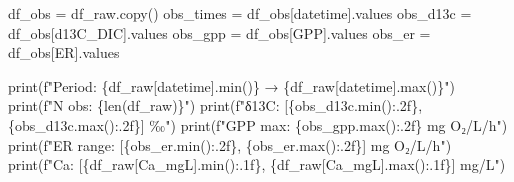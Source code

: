 \documentclass[
  letterpaper,
  DIV=11,
  numbers=noendperiod]{scrartcl}
\newenvironment{Shaded}{\begin{snugshade}}{\end{snugshade}}
\newcommand{\BuiltInTok}[1]{\textcolor[rgb]{0.00,0.23,0.31}{#1}}
\newcommand{\NormalTok}[1]{\textcolor[rgb]{0.00,0.23,0.31}{#1}}
\newcommand{\OperatorTok}[1]{\textcolor[rgb]{0.37,0.37,0.37}{#1}}
\newcommand{\SpecialCharTok}[1]{\textcolor[rgb]{0.37,0.37,0.37}{#1}}
\newcommand{\SpecialStringTok}[1]{\textcolor[rgb]{0.13,0.47,0.30}{#1}}
\newcommand{\StringTok}[1]{\textcolor[rgb]{0.13,0.47,0.30}{#1}}
\begin{document}
\begin{Shaded}
\begin{Highlighting}[]
\NormalTok{df\_obs    }\OperatorTok{=}\NormalTok{ df\_raw.copy()}
\NormalTok{obs\_times }\OperatorTok{=}\NormalTok{ df\_obs[}\StringTok{\textquotesingle{}datetime\textquotesingle{}}\NormalTok{].values}
\NormalTok{obs\_d13c  }\OperatorTok{=}\NormalTok{ df\_obs[}\StringTok{\textquotesingle{}d13C\_DIC\textquotesingle{}}\NormalTok{].values}
\NormalTok{obs\_gpp   }\OperatorTok{=}\NormalTok{ df\_obs[}\StringTok{\textquotesingle{}GPP\textquotesingle{}}\NormalTok{].values}
\NormalTok{obs\_er    }\OperatorTok{=}\NormalTok{ df\_obs[}\StringTok{\textquotesingle{}ER\textquotesingle{}}\NormalTok{].values}

\BuiltInTok{print}\NormalTok{(}\SpecialStringTok{f"Period: }\SpecialCharTok{\{}\NormalTok{df\_raw[}\StringTok{\textquotesingle{}datetime\textquotesingle{}}\NormalTok{]}\SpecialCharTok{.}\BuiltInTok{min}\NormalTok{()}\SpecialCharTok{\}}\SpecialStringTok{ → }\SpecialCharTok{\{}\NormalTok{df\_raw[}\StringTok{\textquotesingle{}datetime\textquotesingle{}}\NormalTok{]}\SpecialCharTok{.}\BuiltInTok{max}\NormalTok{()}\SpecialCharTok{\}}\SpecialStringTok{"}\NormalTok{)}
\BuiltInTok{print}\NormalTok{(}\SpecialStringTok{f"N obs:    }\SpecialCharTok{\{}\BuiltInTok{len}\NormalTok{(df\_raw)}\SpecialCharTok{\}}\SpecialStringTok{"}\NormalTok{)}
\BuiltInTok{print}\NormalTok{(}\SpecialStringTok{f"δ13C:     [}\SpecialCharTok{\{}\NormalTok{obs\_d13c}\SpecialCharTok{.}\BuiltInTok{min}\NormalTok{()}\SpecialCharTok{:.2f\}}\SpecialStringTok{, }\SpecialCharTok{\{}\NormalTok{obs\_d13c}\SpecialCharTok{.}\BuiltInTok{max}\NormalTok{()}\SpecialCharTok{:.2f\}}\SpecialStringTok{] ‰"}\NormalTok{)}
\BuiltInTok{print}\NormalTok{(}\SpecialStringTok{f"GPP max:  }\SpecialCharTok{\{}\NormalTok{obs\_gpp}\SpecialCharTok{.}\BuiltInTok{max}\NormalTok{()}\SpecialCharTok{:.2f\}}\SpecialStringTok{ mg O₂/L/h"}\NormalTok{)}
\BuiltInTok{print}\NormalTok{(}\SpecialStringTok{f"ER range: [}\SpecialCharTok{\{}\NormalTok{obs\_er}\SpecialCharTok{.}\BuiltInTok{min}\NormalTok{()}\SpecialCharTok{:.2f\}}\SpecialStringTok{, }\SpecialCharTok{\{}\NormalTok{obs\_er}\SpecialCharTok{.}\BuiltInTok{max}\NormalTok{()}\SpecialCharTok{:.2f\}}\SpecialStringTok{] mg O₂/L/h"}\NormalTok{)}
\BuiltInTok{print}\NormalTok{(}\SpecialStringTok{f"Ca:       [}\SpecialCharTok{\{}\NormalTok{df\_raw[}\StringTok{\textquotesingle{}Ca\_mgL\textquotesingle{}}\NormalTok{]}\SpecialCharTok{.}\BuiltInTok{min}\NormalTok{()}\SpecialCharTok{:.1f\}}\SpecialStringTok{, }\SpecialCharTok{\{}\NormalTok{df\_raw[}\StringTok{\textquotesingle{}Ca\_mgL\textquotesingle{}}\NormalTok{]}\SpecialCharTok{.}\BuiltInTok{max}\NormalTok{()}\SpecialCharTok{:.1f\}}\SpecialStringTok{] mg/L"}\NormalTok{)}


\end{Highlighting}
\end{Shaded}
\end{document}
